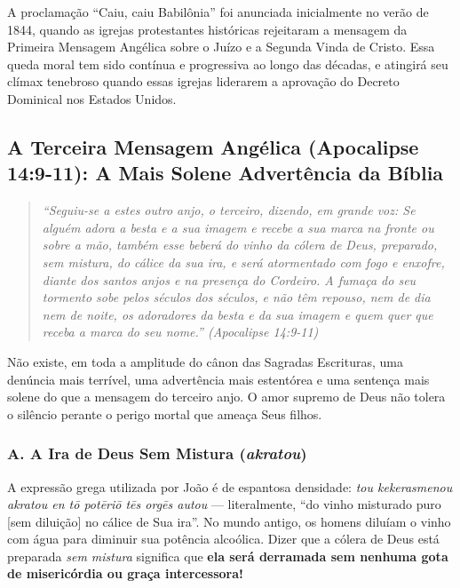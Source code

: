 \documentclass[11pt,a4paper,openany]{book}
\begin{document}
A proclamação ``Caiu, caiu Babilônia'' foi anunciada inicialmente no verão de 1844, quando as igrejas protestantes históricas rejeitaram a mensagem da Primeira Mensagem Angélica sobre o Juízo e a Segunda Vinda de Cristo. Essa queda moral tem sido contínua e progressiva ao longo das décadas, e atingirá seu clímax tenebroso quando essas igrejas liderarem a aprovação do Decreto Dominical nos Estados Unidos.



\subsection{A Terceira Mensagem Angélica (Apocalipse 14:9-11): A Mais Solene Advertência da Bíblia}



\begin{quote}
\itshape \textit{``Seguiu-se a estes outro anjo, o terceiro, dizendo, em grande voz: Se alguém adora a besta e a sua imagem e recebe a sua marca na fronte ou sobre a mão, também esse beberá do vinho da cólera de Deus, preparado, sem mistura, do cálice da sua ira, e será atormentado com fogo e enxofre, diante dos santos anjos e na presença do Cordeiro. A fumaça do seu tormento sobe pelos séculos dos séculos, e não têm repouso, nem de dia nem de noite, os adoradores da besta e da sua imagem e quem quer que receba a marca do seu nome.''} (Apocalipse 14:9-11)
\end{quote}


Não existe, em toda a amplitude do cânon das Sagradas Escrituras, uma denúncia mais terrível, uma advertência mais estentórea e uma sentença mais solene do que a mensagem do terceiro anjo. O amor supremo de Deus não tolera o silêncio perante o perigo mortal que ameaça Seus filhos.


\subsubsection*{A. A Ira de Deus Sem Mistura (\textit{akratou})}

A expressão grega utilizada por João é de espantosa densidade: \textit{tou kekerasmenou akratou en tō potēriō tēs orgēs autou} — literalmente, ``do vinho misturado puro [sem diluição] no cálice de Sua ira''. No mundo antigo, os homens diluíam o vinho com água para diminuir sua potência alcoólica. Dizer que a cólera de Deus está preparada \textit{sem mistura} significa que \textbf{ela será derramada sem nenhuma gota de misericórdia ou graça intercessora!}
\end{document}
